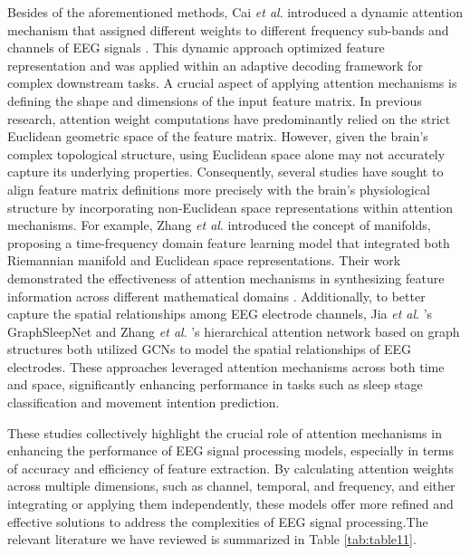 \documentclass[preprint,12pt]{elsarticle}
\newcommand{\etal}{\textit{et al}. }
\begin{document}
Besides of the aforementioned methods, Cai \etal introduced a dynamic attention mechanism that assigned different weights to different frequency sub-bands and channels of EEG signals \cite{cai2021eeg}. This dynamic approach optimized feature representation and was applied within an adaptive decoding framework for complex downstream tasks. A crucial aspect of applying attention mechanisms is defining the shape and dimensions of the input feature matrix. In previous research, attention weight computations have predominantly relied on the strict Euclidean geometric space of the feature matrix. However, given the brain’s complex topological structure, using Euclidean space alone may not accurately capture its underlying properties. Consequently, several studies have sought to align feature matrix definitions more precisely with the brain’s physiological structure by incorporating non-Euclidean space representations within attention mechanisms. For example, Zhang \etal introduced the concept of manifolds, proposing a time-frequency domain feature learning model that integrated both Riemannian manifold and Euclidean space representations. Their work demonstrated the effectiveness of attention mechanisms in synthesizing feature information across different mathematical domains \cite{zhang2020spatio}. Additionally, to better capture the spatial relationships among EEG electrode channels, Jia \etal's GraphSleepNet \cite{jia2020graphsleepnet} and Zhang \etal's hierarchical attention network based on graph structures \cite{zhang2019graph} both utilized GCNs to model the spatial relationships of EEG electrodes. These approaches leveraged attention mechanisms across both time and space, significantly enhancing performance in tasks such as sleep stage classification and movement intention prediction.

These studies collectively highlight the crucial role of attention mechanisms in enhancing the performance of EEG signal processing models, especially in terms of accuracy and efficiency of feature extraction. By calculating attention weights across multiple dimensions, such as channel, temporal, and frequency, and either integrating or applying them independently, these models offer more refined and effective solutions to address the complexities of EEG signal processing.The relevant literature we have reviewed is summarized in Table \ref{tab:table11}.
\end{document}
